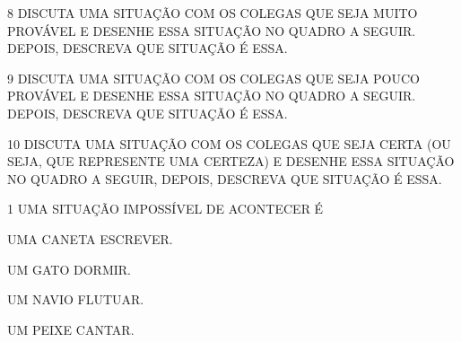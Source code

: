 \num{8} DISCUTA UMA SITUAÇÃO COM OS COLEGAS QUE SEJA MUITO PROVÁVEL E DESENHE
ESSA SITUAÇÃO NO QUADRO A SEGUIR. DEPOIS, DESCREVA QUE SITUAÇÃO É ESSA.

\begin{mdframed}[linewidth=2pt,linecolor=salmao,roundcorner=10pt]
\vspace{19cm}
\end{mdframed}


\num{9} DISCUTA UMA SITUAÇÃO COM OS COLEGAS QUE SEJA POUCO PROVÁVEL E DESENHE
ESSA SITUAÇÃO NO QUADRO A SEGUIR. DEPOIS, DESCREVA QUE SITUAÇÃO É ESSA.

\begin{mdframed}[linewidth=2pt,linecolor=salmao,roundcorner=10pt]
\vspace{20cm}
\end{mdframed}


\num{10} DISCUTA UMA SITUAÇÃO COM OS COLEGAS QUE SEJA CERTA (OU SEJA, QUE REPRESENTE UMA CERTEZA) E DESENHE ESSA SITUAÇÃO NO QUADRO A SEGUIR, DEPOIS, DESCREVA QUE SITUAÇÃO É ESSA.

\begin{mdframed}[linewidth=2pt,linecolor=salmao,roundcorner=10pt]
\vspace{20cm}
\end{mdframed}


\num{1} UMA SITUAÇÃO IMPOSSÍVEL DE ACONTECER É

\begin{minipage}{.5\textwidth}
\begin{escolha}
\item UMA CANETA ESCREVER.

\item UM GATO DORMIR.

\item UM NAVIO FLUTUAR.

\item UM PEIXE CANTAR.
\end{escolha}
\end{minipage}

